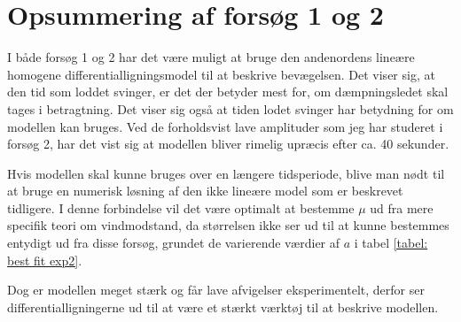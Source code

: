 \section{Opsummering af forsøg 1 og 2}
I både forsøg 1 og 2 har det være muligt at bruge den andenordens lineære homogene differentialligningsmodel til at beskrive bevægelsen. 
Det viser sig, at den tid som loddet svinger, er det der betyder mest for, om dæmpningsledet skal tages i betragtning. 
Det viser sig også at tiden lodet svinger har betydning for om modellen kan bruges. 
Ved de forholdsvist lave amplituder som jeg har studeret i forsøg 2, har det vist sig at modellen bliver rimelig upræcis efter ca. 40 sekunder. 

Hvis modellen skal kunne bruges over en længere tidsperiode, blive man nødt til at bruge en numerisk løsning af den ikke lineære model som er beskrevet tidligere.
I denne forbindelse vil det være optimalt at bestemme $\mu$ ud fra mere specifik teori om vindmodstand, da størrelsen ikke ser ud til at kunne bestemmes entydigt ud fra disse forsøg, grundet de varierende værdier af $a$ i tabel \ref{tabel: best fit exp2}.

Dog er modellen meget stærk og får lave afvigelser eksperimentelt, derfor ser differentialligningerne ud til at være et stærkt værktøj til at beskrive modellen. 
